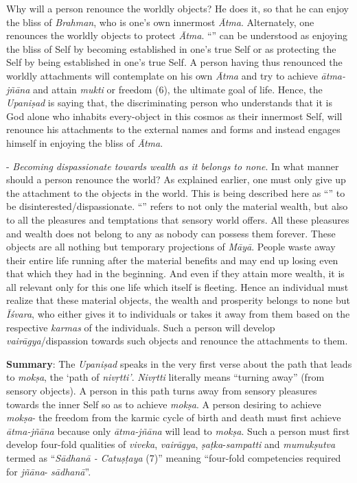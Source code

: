 Why will a person renounce the worldly objects? He does it, so that he can enjoy the bliss of \emph{Brahman}, who is one's own innermost \emph{Ātma}. Alternately, one renounces the worldly objects to protect \emph{Ātma}. ``'' can be understood as enjoying the bliss of Self by becoming established in one's true Self or as protecting the Self by being established in one's true Self. A person having thus renounced the worldly attachments will contemplate on his own \emph{Ātma} and try to achieve \emph{ātma-jñāna} and attain \emph{mukti} or freedom (6), the ultimate goal of life. Hence, the \emph{Upaniṣad} is saying that, the discriminating person who understands that it is God alone who inhabits every-object in this cosmos as their innermost Self, will renounce his attachments to the external names and forms and instead engages himself in enjoying the bliss of \emph{Ātma}.
\vskip 1.1pt

- \emph{Becoming dispassionate towards wealth as it belongs to none}. In what manner should a person renounce the world? As explained earlier, one must only give up the attachment to the objects in the world. This is being described here as ``'' to be disinterested/dispassionate. ``'' refers to not only the material wealth, but also to all the pleasures and temptations that sensory world offers. All these pleasures and wealth does not belong to any as nobody can possess them forever. These objects are all nothing but temporary projections of \emph{Māyā}. People waste away their entire life running after the material benefits and may end up losing even that which they had in the beginning. And even if they attain more wealth, it is all relevant only for this one life which itself is fleeting. Hence an individual must realize that these material objects, the wealth and prosperity belongs to none but \emph{Īśvara}, who either gives it to individuals or takes it away from them based on the respective \emph{karmas} of the individuals. Such a person will develop \emph{vairāgya}/dispassion towards such objects and renounce the attachments to them.
\vskip 1.1pt

\textbf{Summary}: The \emph{Upaniṣad} speaks in the very first verse about the path that leads to \emph{mokṣa}, the `path of \emph{nivṛtti'}. \emph{Nivṛtti} literally means ``turning away'' (from sensory objects). A person in this path turns away from sensory pleasures towards the inner Self so as to achieve \emph{mokṣa}. A person desiring to achieve \emph{mokṣa}- the freedom from the karmic cycle of birth and death must first achieve \emph{ātma-jñāna} because only \emph{ātma-jñāna} will lead to \emph{mokṣa}. Such a person must first develop four-fold qualities of \emph{viveka}, \emph{vairāgya}, \emph{ṣaṭka}-\emph{sampatti} and \emph{mumukṣutva} termed as ``\emph{Sādhanā - Catuṣṭaya} (7)'' meaning ``four-fold competencies required for \emph{jñāna}- \emph{sādhanā}''.
\vskip 1.1pt

